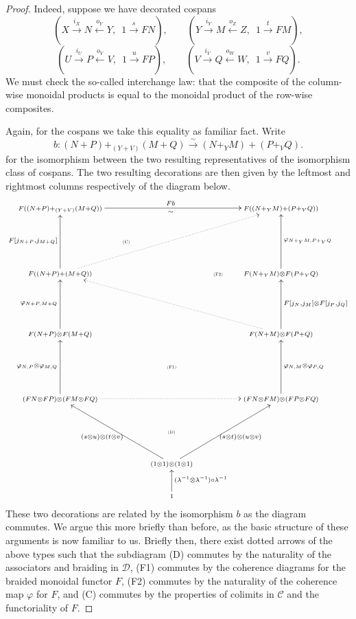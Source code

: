 \begin{proof}
  Indeed, suppose we have decorated cospans
\[
  (X \stackrel{i_X}\longrightarrow N \stackrel{o_Y}\longleftarrow Y,\enspace 1
  \stackrel{s}\longrightarrow FN),
  \qquad
  (Y \stackrel{i_Y}\longrightarrow M \stackrel{o_Z}\longleftarrow Z,\enspace 1
  \stackrel{t}\longrightarrow FM), 
\]
\[
  (U \stackrel{i_U}\longrightarrow P \stackrel{o_V}\longleftarrow V,\enspace 1
  \stackrel{u}\longrightarrow FP),
  \qquad
  (V \stackrel{i_V}\longrightarrow Q \stackrel{o_W}\longleftarrow W,\enspace 1
  \stackrel{v}\longrightarrow FQ). 
\]
We must check the so-called interchange law: that the composite of the
column-wise monoidal products is equal to the monoidal product of the row-wise
composites.

Again, for the cospans we take this equality as familiar fact. Write 
\[
  b\colon  (N+P)+_{(Y+V)}(M+Q) \stackrel{\sim}{\longrightarrow} (N+_YM)+(P+_{V}Q).
\]
for the isomorphism between the two resulting representatives of the isomorphism
class of cospans. The two resulting decorations are then given by the leftmost 
and rightmost columns respectively of the diagram below.
\[
  \xymatrixcolsep{1.4pc}
  \xymatrix{ 
    \scriptstyle F((N+P)+_{(Y+V)}(M+Q)) \ar[rrrr]^{Fb}_{\sim} &&&&
    \scriptstyle F((N+_YM)+(P+_VQ)) \\
    & \textsc{\tiny(C)} \\
    \scriptstyle F((N+P)+(M+Q)) \ar[uu]^{F[j_{N+P},j_{M+Q}]} \ar@{.>}[uurrrr] &&&
    \textsc{\tiny(F2)} & \scriptstyle F(N+_YM)\otimes F(P+_VQ)
    \ar[uu]_{\varphi_{N+_YM,P+_VQ}} \\
    \\
    \scriptstyle F(N+P)\otimes F(M+Q) \ar[uu]^{\varphi_{N+P,M+Q}} &&&&
    \scriptstyle F(N+M)\otimes F(P+Q) \ar@{.>}[uullll]
    \ar[uu]_{F[j_N,j_M] \otimes F[j_P,j_Q]} \\
    && \textsc{\tiny(F1)} \\
    \scriptstyle (FN \otimes FP) \otimes (FM \otimes FQ) \ar[uu]^{\varphi_{N,P} \otimes
    \varphi_{M,Q}} \ar@{.>}[rrrr] &&&& \scriptstyle (FN \otimes FM) \otimes (FP \otimes FQ)
    \ar[uu]_{\varphi_{N,M} \otimes \varphi_{P,Q}} \\
    && \textsc{\tiny(D)} \\
    && \scriptstyle (1\otimes1)\otimes(1\otimes1) \ar[uull]^{(s\otimes u) \otimes (t \otimes
    v)} \ar[uurr]_{(s \otimes t) \otimes (u \otimes v)} \\
    && \scriptstyle 1 \ar[u]_{(\lambda^{-1}\otimes\lambda^{-1})\circ\lambda^{-1}}
  }
\]
These two decorations are related by the isomorphism $b$ as the diagram
commutes. We argue this more briefly than before, as the basic structure of
these arguments is now familiar to us. Briefly then, there exist dotted arrows
of the above types such that the subdiagram (D) commutes by the naturality of
the associators and braiding in $\mathcal D$, (F1) commutes by the coherence
diagrams for the braided monoidal functor $F$, (F2) commutes by the naturality of
the coherence map $\varphi$ for $F$, and (C) commutes by the properties of
colimits in $\mathcal C$ and the functoriality of $F$. 


\end{proof}
